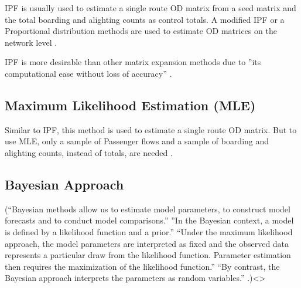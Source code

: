 \documentclass[11pt,twoside]{article}
\numberwithin{equation}{section}
\newcommand{\?}{\stackrel{?}{=}}
\begin{document}
IPF is usually used to estimate a single route OD matrix from a seed matrix and the total boarding and alighting counts as control totals.  A modified IPF or a Proportional distribution methods are used to estimate OD matrices on the network level \citep{cuiBusPassengerOriginDestination2006}. 

IPF is more desirable than other matrix expansion methods due to ''its computational ease without loss of accuracy'' \citep{ben-akivaALTERNATIVEMETHODSESTIMATE1985}.


\subsection{Maximum Likelihood Estimation (MLE)}

Similar to IPF, this method is used to estimate a single route OD matrix. But to use MLE, only a sample of Passenger flows and a sample of boarding and alighting counts, instead of totals, are needed \citep{cuiBusPassengerOriginDestination2006}. 


\subsection{Bayesian Approach}
(``Bayesian methods allow us to estimate model parameters, to construct model forecasts and to conduct model comparisons.'' ''In the Bayesian context, a model is defined by a likelihood function and a prior.'' ``Under the maximum likelihood approach, the model parameters are interpreted as fixed and the observed data represents a particular draw from the likelihood function. Parameter estimation then requires the maximization of the likelihood function.'' ``By contrast, the Bayesian approach interprets the parameters as random variables.'' \citep{BayesianMethodOverview}.)<>







\end{document}
